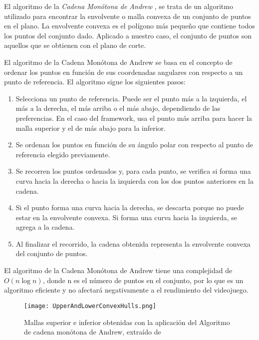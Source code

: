 El algoritmo de la \textit{Cadena Monótona de Andrew} \cite{MonotoneChain}, se trata de un algoritmo utilizado para encontrar la envolvente o malla convexa de un conjunto de puntos en el plano. La envolvente convexa es el polígono más pequeño que contiene todos los puntos del conjunto dado. Aplicado a nuestro caso, el conjunto de puntos son aquellos que se obtienen con el plano de corte.

El algoritmo de la Cadena Monótona de Andrew se basa en el concepto de ordenar los puntos en función de sus coordenadas angulares con respecto a un punto de referencia. El algoritmo sigue los siguientes pasos:

\begin{enumerate}
    \item Selecciona un punto de referencia. Puede ser el punto más a la izquierda, el más a la derecha, el más arriba o el más abajo, dependiendo de las preferencias. En el caso del framework, usa el punto más arriba para hacer la malla superior y el de más abajo para la inferior.
    
    \item Se ordenan los puntos en función de su ángulo polar con respecto al punto de referencia elegido previamente.
    
    \item Se recorren los puntos ordenados y, para cada punto, se verifica si forma una curva hacia la derecha o hacia la izquierda con los dos puntos anteriores en la cadena.
    
    \item Si el punto forma una curva hacia la derecha, se descarta porque no puede estar en la envolvente convexa. Si forma una curva hacia la izquierda, se agrega a la cadena.
    
    \item Al finalizar el recorrido, la cadena obtenida representa la envolvente convexa del conjunto de puntos.
    
\end{enumerate}

El algoritmo de la Cadena Monótona de Andrew tiene una complejidad de $O(n \log n)$, donde n es el número de puntos en el conjunto, por lo que es un algoritmo eficiente y no afectará negativamente a el rendimiento del videojuego.

\begin{figure}[H]
    \centering
    \texttt{[image: UpperAndLowerConvexHulls.png]}
    \caption{Mallas superior e inferior obtenidas con la aplicación del Algoritmo de cadena monótona de Andrew, extraído de \cite{MonotoneChain}}
\end{figure}

